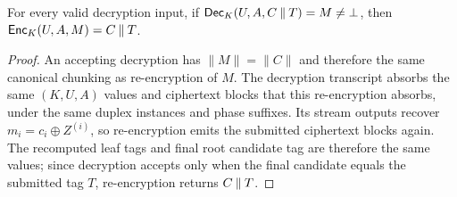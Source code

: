 \begin{lemma}[\TW{} tidiness]
\label{lem:tw-tidiness}
For every valid \TW{} decryption input, if
$\mathsf{Dec}_K(U, A, C \mathbin{\|} T) = M \neq \bot$, then
$\mathsf{Enc}_K(U, A, M) = C \mathbin{\|} T$.
\end{lemma}

\begin{proof}
An accepting decryption has $\|M\| = \|C\|$ and therefore the same canonical
chunking as re-encryption of $M$. The decryption transcript absorbs the same
$(K, U, A)$ values and ciphertext blocks that this re-encryption absorbs, under
the same duplex instances and phase suffixes. Its stream outputs recover
$m_i = c_i \oplus Z^{(i)}$, so re-encryption emits the submitted ciphertext blocks
again. The recomputed leaf tags and final root candidate tag are therefore the
same values; since decryption accepts only when the final candidate equals the
submitted tag $T$, re-encryption returns $C \mathbin{\|} T$.
\end{proof}

